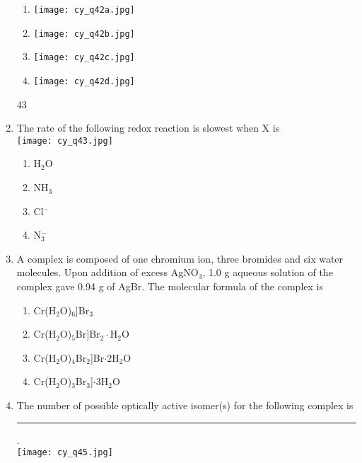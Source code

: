 \documentclass[12pt]{article}
\begin{document}
\begin{enumerate}[label=Q.\arabic*]
							\vspace{1ex}
							\begin{multicols}{2}
							\begin{enumerate}[label=(\Alph*)]
							\item \texttt{[image: cy\_q42a.jpg]}
							\item \texttt{[image: cy\_q42b.jpg]}
							\item \texttt{[image: cy\_q42c.jpg]}
							\item \texttt{[image: cy\_q42d.jpg]}
							\end{enumerate}
							\end{multicols}
							43
							\item The rate of the following redox reaction is slowest when X is\\[1ex]
							\texttt{[image: cy\_q43.jpg]}

							\vspace{1ex}
							\begin{multicols}{2}
							\begin{enumerate}[label=(\Alph*)]
							\item H$_2$O
							\item NH$_3$
							\item Cl$^-$
							\item N$_3^-$
							\end{enumerate}
							\end{multicols}

							\item A complex is composed of one chromium ion, three bromides and six water molecules. Upon addition of excess AgNO$_3$, 1.0 g aqueous solution of the complex gave 0.94 g of AgBr. The molecular formula of the complex is\\[1ex]
							\begin{enumerate}[label=(\Alph*)]
							\item Cr(H$_2$O)$_6$]Br$_3$
							\item Cr(H$_2$O)$_5$Br]Br$_2\cdot$H$_2$O
							\item Cr(H$_2$O)$_4$Br$_2$]Br$\cdot$2H$_2$O
							\item Cr(H$_2$O)$_3$Br$_3$]$\cdot$3H$_2$O
							\end{enumerate}

							\item The number of possible optically active isomer(s) for the following complex is \rule{2cm}{0.15mm}.\\[1ex]
							\texttt{[image: cy\_q45.jpg]}


\end{enumerate}
\end{document}
